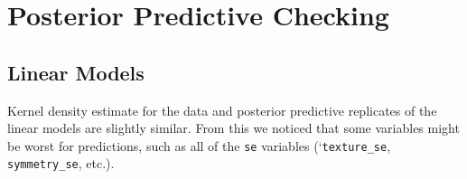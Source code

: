 \documentclass[
]{article}
\begin{document}
\hypertarget{posterior-predictive-checking}{%
\section{Posterior Predictive
Checking}\label{posterior-predictive-checking}}

\hypertarget{linear-models-1}{%
\subsection{Linear Models}\label{linear-models-1}}

Kernel density estimate for the data and posterior predictive replicates
of the linear models are slightly similar. From this we noticed that
some variables might be worst for predictions, such as all of the
\texttt{se} variables (`\texttt{texture\_se}, \texttt{symmetry\_se},
etc.).
\end{document}
